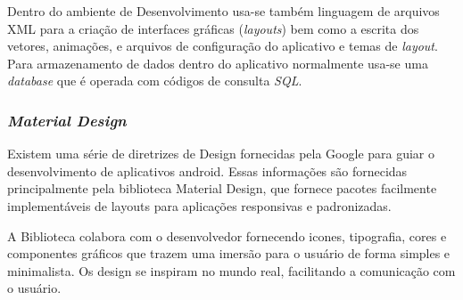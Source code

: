 Dentro do ambiente de Desenvolvimento usa-se também linguagem de arquivos XML para a criação de interfaces gráficas (\textit{layouts}) bem como a escrita dos vetores, animações, e arquivos de configuração do aplicativo e temas de \textit{layout}. Para armazenamento de dados dentro do aplicativo normalmente usa-se uma \textit{database} que é operada com códigos de consulta \textit{SQL}.

\subsubsection{\textit{Material Design}}
Existem uma série de diretrizes de Design fornecidas pela Google para guiar o desenvolvimento de aplicativos android. Essas informações são fornecidas principalmente pela biblioteca Material Design, que fornece pacotes facilmente implementáveis de layouts para aplicações responsivas e padronizadas.

A Biblioteca colabora com o desenvolvedor fornecendo icones, tipografia, cores e componentes gráficos que trazem uma imersão para o usuário de forma simples e minimalista. Os design se inspiram no mundo real, facilitando a comunicação com o usuário. \cite{site:materialdesign}



